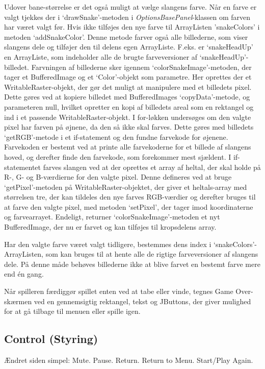 Udover bane-størrelse er det også muligt at vælge slangens farve. Når en farve er valgt tjekkes der i `drawSnake'-metoden i \textit{OptionsBasePanel}-klassen om farven har været valgt før. Hvis ikke tilføjes den nye farve til ArrayListen 'snakeColors' i metoden `addSnakeColor'. Denne metode farver også alle billederne, som viser slangens dele og tilføjer den til delens egen ArrayListe. F.eks. er `snakeHeadUp' en ArrayListe, som indeholder alle de brugte farveversioner af `snakeHeadUp'-billedet. Farvningen af billederne sker igennem `colorSnakeImage'-metoden, der tager et BufferedImage og et `Color'-objekt som parametre. Her oprettes der et WritableRaster-objekt, der gør det muligt at manipulere med et billedets pixel. Dette gøres ved at kopiere billedet med BufferedImages `copyData'-metode, og parameteren null, hvilket opretter en kopi af billedets areal som en rektangel og ind i et passende WritableRaster-objekt. I for-løkken undersøges om den valgte pixel har farven på øjnene, da den så ikke skal farves. Dette gøres med billedets `getRGB'-metode i et if-statement og den fundne farvekode for øjenene. Farvekoden er bestemt ved at printe alle farvekoderne for et billede af slangens hoved, og derefter finde den farvekode, som forekommer mest sjældent. I if-statementet farves slangen ved at der oprettes et array af heltal, der skal holde på R-, G- og B-værdierne for den valgte pixel. Denne defineres ved at bruge `getPixel'-metoden på WritableRaster-objektet, der giver et heltals-array med størrelsen tre, der kan tildeles den nye farves RGB-værdier og derefter bruges til at farve den valgte pixel, med metoden `setPixel', der tager imod koordinaterne og farvearrayet. Endeligt, returner `colorSnakeImage'-metoden et nyt BufferedImage, der nu er farvet og kan tilføjes til kropsdelens array.

Har den valgte farve været valgt tidligere, bestemmes dens index i `snakeColors'-ArrayListen, som kan bruges til at hente alle de rigtige farveversioner af slangens dele. På denne måde behøves billederne ikke at blive farvet en bestemt farve mere end én gang.

Når spilleren færdiggør spillet enten ved at tabe eller vinde, tegnes Game Over-skærmen ved en gennemsigtig rektangel, tekst og JButtons, der giver mulighed for at gå tilbage til menuen eller spille igen.

\subsection{Control (Styring)}
Ændret siden simpel: Mute. Pause. Return. Return to Menu. Start/Play Again.

